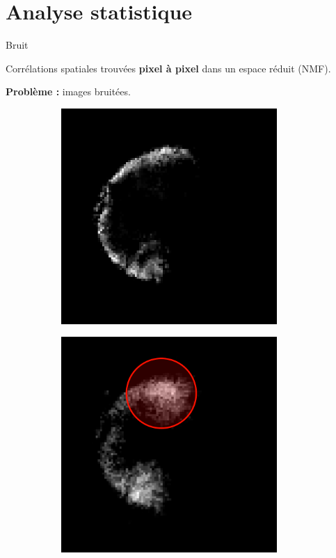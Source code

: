 \documentclass[10pt]{beamer}
\begin{document}
\section{Analyse statistique}

\begin{frame}{Bruit}

  Corrélations spatiales trouvées \textbf{pixel à pixel} dans un espace réduit (NMF).

  \textbf{Problème :} images bruitées.

  \begin{figure}[ht]
    \centering
    \begin{subfigure}[t]{0.33\textwidth}
      \centering
      \includegraphics[width=0.9\textwidth]{fig/nmf_components_0}
      \caption{}
      \label{subfig:cluster0}
    \end{subfigure}%
     \begin{subfigure}[t]{0.33\textwidth}
      \centering
      \includegraphics[width=0.9\textwidth]{fig/nmf_components_2_closeup}

\end{subfigure}
\end{figure}
\end{frame}
\end{document}

